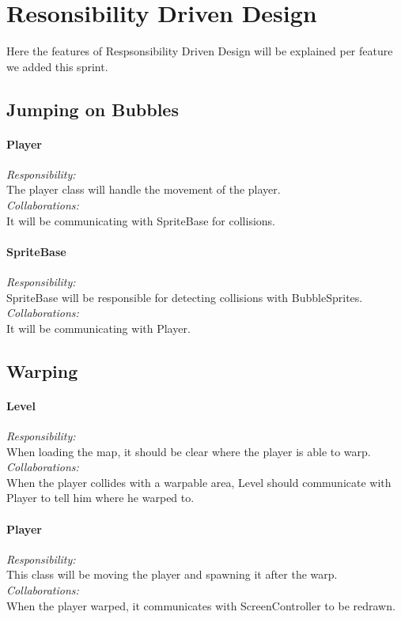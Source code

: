 \chapter{Resonsibility Driven Design}
Here the features of Respsonsibility Driven Design will be explained per feature we added this sprint.

\section{Jumping on Bubbles}
\subsubsection{Player}
\textit{Responsibility:}  \\
The player class will handle the movement of the player. \\
\textit{Collaborations:} \\
It will be communicating with SpriteBase for collisions. \\

\subsubsection{SpriteBase}
\textit{Responsibility:}  \\
SpriteBase will be responsible for detecting collisions with BubbleSprites. \\
\textit{Collaborations:} \\
It will be communicating with Player. \\

\section{Warping}
\subsubsection{Level}
\textit{Responsibility:}  \\
When loading the map, it should be clear where the player is able to warp. \\
\textit{Collaborations:} \\
When the player collides with a warpable area, Level should communicate with Player to tell him where he warped to. \\

\subsubsection{Player}
\textit{Responsibility:}  \\
This class will be moving the player and spawning it after the warp. \\
\textit{Collaborations:} \\
When the player warped, it communicates with ScreenController to be redrawn. \\

